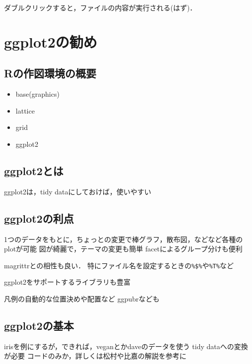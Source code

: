 \documentclass[
]{article}
\providecommand{\tightlist}{%
  \setlength{\itemsep}{0pt}\setlength{\parskip}{0pt}}
\begin{document}
ダブルクリックすると，ファイルの内容が実行される(はず)．

\hypertarget{ggplot2}{%
\section{ggplot2の勧め}\label{ggplot2}}

\hypertarget{rux306eux4f5cux56f3ux74b0ux5883ux306eux6982ux8981}{%
\subsection{Rの作図環境の概要}\label{rux306eux4f5cux56f3ux74b0ux5883ux306eux6982ux8981}}

\begin{itemize}
\tightlist
\item
  base(graphics)
\item
  lattice
\item
  grid
\item
  ggplot2
\end{itemize}

\hypertarget{ggplot2ux3068ux306f}{%
\subsection{ggplot2とは}\label{ggplot2ux3068ux306f}}

ggplot2は，tidy dataにしておけば，使いやすい

\hypertarget{ggplot2ux306eux5229ux70b9}{%
\subsection{ggplot2の利点}\label{ggplot2ux306eux5229ux70b9}}

1つのデータをもとに，ちょっとの変更で棒グラフ，散布図，などなど各種のplotが可能
図が綺麗で，テーマの変更も簡単
facetによるグループ分けも便利

magrittrとの相性も良い．
特にファイル名を設定するときの\texttt{\%\$\%}や\texttt{\%T\%}など

ggplot2をサポートするライブラリも豊富

凡例の自動的な位置決めや配置など
ggpubrなども

\hypertarget{ggplot2ux306eux57faux672c}{%
\subsection{ggplot2の基本}\label{ggplot2ux306eux57faux672c}}

irisを例にするが，できれば，veganとかdaveのデータを使う
tidy dataへの変換が必要
コードのみか，詳しくは松村や比嘉の解説を参考に
\end{document}
